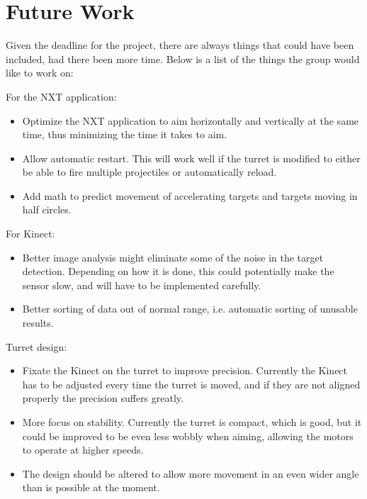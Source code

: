 \section{Future Work}
Given the deadline for the project, there are always things that could have been included, had there been more time. Below is a list of the things the group would like to work on:

For the NXT application:
\begin{itemize}
	\item Optimize the NXT application to aim horizontally and vertically at the same time, thus minimizing the time it takes to aim.
	\item Allow automatic restart. This will work well if the turret is modified to either be able to fire multiple projectiles or automatically reload.
	\item Add math to predict movement of accelerating targets and targets moving in half circles.
\end{itemize}

For Kinect:
\begin{itemize}
	\item Better image analysis might eliminate some of the noise in the target detection. Depending on how it is done, this could potentially make the sensor slow, and will have to be implemented carefully.
	\item Better sorting of data out of normal range, i.e. automatic sorting of unusable results. 
\end{itemize}

Turret design:
\begin{itemize}
	\item Fixate the Kinect on the turret to improve precision. Currently the Kinect has to be adjusted every time the turret is moved, and if they are not aligned properly the precision suffers greatly.
	\item More focus on stability. Currently the turret is compact, which is good, but it could be improved to be even less wobbly when aiming, allowing the motors to operate at higher speeds.
	\item The design should be altered to allow more movement in an even wider angle than is possible at the moment. 
\end{itemize}